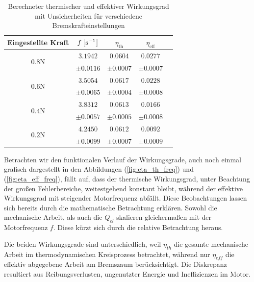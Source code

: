 \begin{table}[H]
  \centering
  \begin{tabular}{c c c c c}
  \toprule
  \textbf{Eingestellte Kraft} & \boldmath$f\,\qty[\si{\per\second}]$ & \boldmath$\eta_{\text{th}}$ & \boldmath$\eta_{\text{eff}}$ \\
  \midrule
  \multirow{2}{*}{\boldmath$0.8\si{\newton}$} & $3.1942$& $0.0604$ & $0.0277$ \\
   & $\pm 0.0116$ & $\pm 0.0007$ & $\pm 0.0007$ \\
  \midrule
  \multirow{2}{*}{\boldmath$0.6\si{\newton}$} & $3.5054$ & $0.0617$ & $0.0228$ \\
   & $\pm 0.0065$ & $\pm 0.0004$ & $\pm 0.0008$ \\
  \midrule
  \multirow{2}{*}{\boldmath$0.4\si{\newton}$} &  $3.8312$& $0.0613$ & $0.0166$ \\
   &  $\pm 0.0057$& $\pm 0.0005$ & $\pm 0.0008$ \\
  \midrule
  \multirow{2}{*}{\boldmath$0.2\si{\newton}$} &  $4.2450$& $0.0612$ & $0.0092$ \\
   &  $\pm 0.0099$ & $\pm 0.0007$ & $\pm 0.0009$ \\
  \bottomrule
  \end{tabular}
  \label{tab:werte_gebremst_kurz}
  \caption{Berechneter thermischer und effektiver Wirkungsgrad mit Unsicherheiten für verschiedene Bremskrafteinstellungen}
\end{table}
Betrachten wir den funktionalen Verlauf der Wirkungsgrade, auch noch einmal grafisch dargestellt in den Abbildungen (\ref{fig:eta_th_freq}) und (\ref{fig:eta_eff_freq}), fällt auf, dass der thermische Wirkungsgrad, unter Beachtung der großen Fehlerbereiche, weitestgehend konstant bleibt, während der effektive Wirkungsgrad mit steigender Motorfrequenz abfällt. Diese Beobachtungen lassen sich bereits durch die mathematische Betrachtung erklären. Sowohl die mechanische Arbeit, als auch die $Q_{el}$ skalieren gleichermaßen mit der Motorfrequenz $f$. Diese kürzt sich durch die relative Betrachtung heraus. 

Die beiden Wirkungsgrade sind unterschiedlich, weil $\eta_{th}$ die gesamte mechanische Arbeit im thermodynamischen Kreisprozess betrachtet, während nur $\eta_{eff}$ die effektiv abgegebene Arbeit am Bremszaum berücksichtigt. Die Diskrepanz resultiert aus Reibungsverlusten, ungenutzter Energie und Ineffizienzen im Motor.